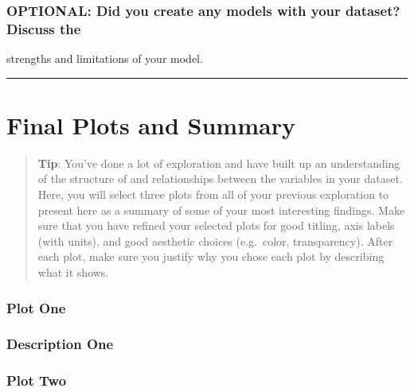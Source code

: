 \documentclass[]{article}
\begin{document}
\hypertarget{optional-did-you-create-any-models-with-your-dataset-discuss-the}{%
\subsubsection{\texorpdfstring{OPTIONAL: Did you create any models with
your dataset? Discuss the\\
}{OPTIONAL: Did you create any models with your dataset? Discuss the }}\label{optional-did-you-create-any-models-with-your-dataset-discuss-the}}

strengths and limitations of your model.

\begin{center}\rule{0.5\linewidth}{\linethickness}\end{center}

\hypertarget{final-plots-and-summary}{%
\section{Final Plots and Summary}\label{final-plots-and-summary}}

\begin{quote}
\textbf{Tip}: You've done a lot of exploration and have built up an
understanding of the structure of and relationships between the
variables in your dataset. Here, you will select three plots from all of
your previous exploration to present here as a summary of some of your
most interesting findings. Make sure that you have refined your selected
plots for good titling, axis labels (with units), and good aesthetic
choices (e.g.~color, transparency). After each plot, make sure you
justify why you chose each plot by describing what it shows.
\end{quote}

\hypertarget{plot-one}{%
\subsubsection{Plot One}\label{plot-one}}

\hypertarget{description-one}{%
\subsubsection{Description One}\label{description-one}}

\hypertarget{plot-two}{%
\subsubsection{Plot Two}\label{plot-two}}
\end{document}
